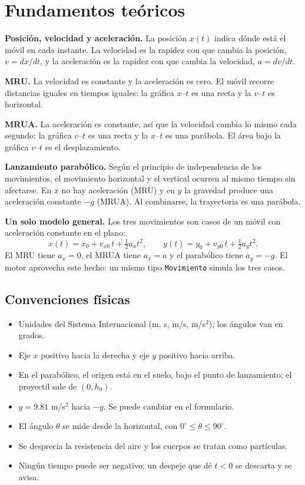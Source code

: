 \documentclass[11pt,letterpaper]{article}
\begin{document}
\section{Fundamentos teóricos}

\textbf{Posición, velocidad y aceleración.} La posición $x(t)$ indica dónde está el móvil en cada instante. La velocidad es la rapidez con que cambia la posición, $v = dx/dt$, y la aceleración es la rapidez con que cambia la velocidad, $a = dv/dt$.

\textbf{MRU.} La velocidad es constante y la aceleración es cero. El móvil recorre distancias iguales en tiempos iguales: la gráfica $x$–$t$ es una recta y la $v$–$t$ es horizontal.

\textbf{MRUA.} La aceleración es constante, así que la velocidad cambia lo mismo cada segundo: la gráfica $v$–$t$ es una recta y la $x$–$t$ es una parábola. El área bajo la gráfica $v$–$t$ es el desplazamiento.

\textbf{Lanzamiento parabólico.} Según el principio de independencia de los movimientos, el movimiento horizontal y el vertical ocurren al mismo tiempo sin afectarse. En $x$ no hay aceleración (MRU) y en $y$ la gravedad produce una aceleración constante $-g$ (MRUA). Al combinarse, la trayectoria es una parábola.

\textbf{Un solo modelo general.} Los tres movimientos son casos de un móvil con aceleración constante en el plano:
\[
  x(t) = x_0 + v_{x0}\,t + \tfrac12 a_x t^2, \qquad y(t) = y_0 + v_{y0}\,t + \tfrac12 a_y t^2 .
\]
El MRU tiene $a_x = 0$, el MRUA tiene $a_x = a$ y el parabólico tiene $a_y = -g$. El motor aprovecha este hecho: un mismo tipo \texttt{Movimiento} simula los tres casos.

\subsection{Convenciones físicas}

\begin{itemize}
  \item Unidades del Sistema Internacional (m, s, m/s, m/s$^2$); los ángulos van en grados.
  \item Eje $x$ positivo hacia la derecha y eje $y$ positivo hacia arriba.
  \item En el parabólico, el origen está en el suelo, bajo el punto de lanzamiento: el proyectil sale de $(0, h_0)$.
  \item $g = 9.81$ m/s$^2$ hacia $-y$. Se puede cambiar en el formulario.
  \item El ángulo $\theta$ se mide desde la horizontal, con $0^\circ \le \theta \le 90^\circ$.
  \item Se desprecia la resistencia del aire y los cuerpos se tratan como partículas.
  \item Ningún tiempo puede ser negativo: un despeje que dé $t < 0$ se descarta y se avisa.
\end{itemize}
\end{document}

